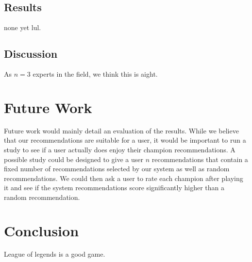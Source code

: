\documentclass [11pt]{IEEEtran}
\begin{document}
\subsection{Results}
none yet lul.
\subsection{Discussion}
As $n=3$ experts in the field, we think this is aight.
\section{Future Work}
Future work would mainly detail an evaluation of the results. While we believe that our recommendations are suitable for a user, it would be important to run a study to see if a user actually does enjoy their champion recommendations. A possible study could be designed to give a user $n$ recommendations that contain a fixed number of recommendations selected by our system as well as random recommendations. We could then ask a user to rate each champion after playing it and see if the system recommendations score significantly higher than a random recommendation.
\section{Conclusion}
League of legends is a good game.
\nocite{*}


\end{document}
